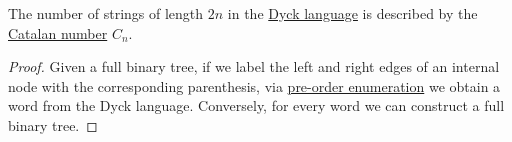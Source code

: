 \begin{corollary}\label{thm:dyck_language_word_count}
  The number of strings of length \( 2n \) in the \hyperref[def:dyck_language]{Dyck language} is described by the \hyperref[def:catalan_number]{Catalan number} \( C_n \).
\end{corollary}
\begin{proof}
  Given a full binary tree, if we label the left and right edges of an internal node with the corresponding parenthesis, via \hyperref[def:ordered_tree_enumeration]{pre-order enumeration} we obtain a word from the Dyck language. Conversely, for every word we can construct a full binary tree.
\end{proof}
